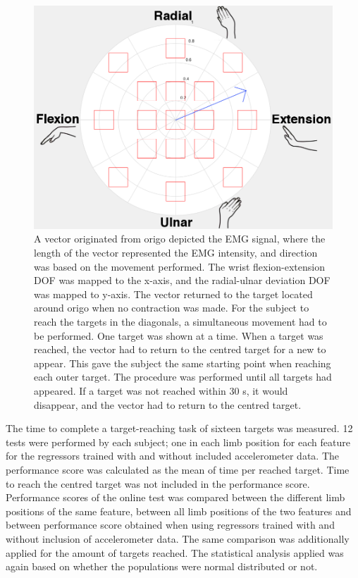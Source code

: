 \begin{multicols}{2}
\begin{figure}[H]
	\centering
	\includegraphics[scale=0.25]{figures/paperFigures/Target}
	\caption{A vector originated from origo depicted the EMG signal, where the length of the vector represented the EMG intensity, and direction was based on the movement performed. The wrist flexion-extension DOF was mapped to the x-axis, and the radial-ulnar deviation DOF was mapped to y-axis. The vector returned to the target located around origo when no contraction was made. For the subject to reach the targets in the diagonals, a simultaneous movement had to be performed. One target was shown at a time. When a target was reached, the vector had to return to the centred target for a new to appear. This gave the subject the same starting point when reaching each outer target. The procedure was performed until all targets had appeared. If a target was not reached within 30 s, it would disappear, and the vector had to return to the centred target.}
	\label{fig:targets}
\end{figure}

The time to complete a target-reaching task of sixteen targets was measured. 12 tests were performed by each subject; one in each limb position for each feature for the regressors trained with and without included accelerometer data. The performance score was calculated as the mean of time per reached target. Time to reach the centred target was not included in the performance score. Performance scores of the online test was compared between the different limb positions of the same feature, between all limb positions of the two features and between performance score obtained when using regressors trained with and without inclusion of accelerometer data. The same comparison was additionally applied for the amount of targets reached. The statistical analysis applied was again based on whether the populations were normal distributed or not. 

\newpage
\clearpage
\end{multicols}

